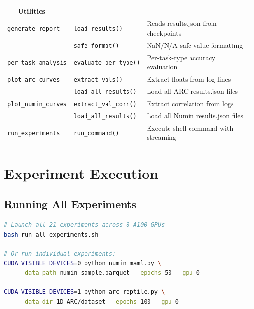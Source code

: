\documentclass[11pt,a4paper]{article}
\begin{document}
\begin{longtable}{p{3cm}p{4cm}p{7.5cm}}
\midrule
\multicolumn{3}{l}{\textbf{--- Utilities ---}} \\
\midrule
\texttt{generate\_report} & \texttt{load\_results()} & Reads results.json from checkpoints \\
 & \texttt{safe\_format()} & NaN/N/A-safe value formatting \\
\midrule
\texttt{per\_task\_analysis} & \texttt{evaluate\_per\_type()} & Per-task-type accuracy evaluation \\
\midrule
\texttt{plot\_arc\_curves} & \texttt{extract\_vals()} & Extract floats from log lines \\
 & \texttt{load\_all\_results()} & Load all ARC results.json files \\
\midrule
\texttt{plot\_numin\_curves} & \texttt{extract\_val\_corr()} & Extract correlation from logs \\
 & \texttt{load\_all\_results()} & Load all Numin results.json files \\
\midrule
\texttt{run\_experiments} & \texttt{run\_command()} & Execute shell command with streaming \\
\bottomrule
\end{longtable}

\section{Experiment Execution}

\subsection{Running All Experiments}
\begin{lstlisting}[language=bash]
# Launch all 21 experiments across 8 A100 GPUs
bash run_all_experiments.sh

# Or run individual experiments:
CUDA_VISIBLE_DEVICES=0 python numin_maml.py \
    --data_path numin_sample.parquet --epochs 50 --gpu 0

CUDA_VISIBLE_DEVICES=1 python arc_reptile.py \
    --data_dir 1D-ARC/dataset --epochs 100 --gpu 0
\end{lstlisting}
\end{document}
